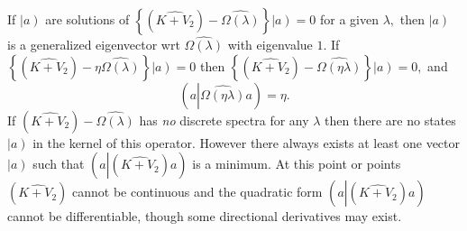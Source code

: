 \documentclass[aps,preprint]{revtex4}%
\begin{document}
If $\left\vert \overset{}{a}\right)  $ are solutions of $\left\{  \left(
\widehat{K+V_{2}}\right)  -\widehat{\Omega\left(  \lambda\right)  }\right\}
\left\vert \overset{}{a}\right)  =0$ for a given $\lambda,$ then $\left\vert
\overset{}{a}\right)  $ is a generalized eigenvector wrt $\widehat{\Omega
\left(  \lambda\right)  }$ with eigenvalue $1.$ If $\left\{  \left(
\widehat{K+V_{2}}\right)  -\eta\widehat{\Omega\left(  \lambda\right)
}\right\}  \left\vert \overset{}{a}\right)  =0$ then $\left\{  \left(
\widehat{K+V_{2}}\right)  -\widehat{\Omega\left(  \eta\lambda\right)
}\right\}  \left\vert \overset{}{a}\right)  =0,$ and
\begin{equation}
\left(  a\left\vert \widehat{\Omega\left(  \eta\lambda\right)  }\right.
a\right)  =\eta.
\end{equation}
If $\left(  \widehat{K+V_{2}}\right)  -\widehat{\Omega\left(  \lambda\right)
}$ has \emph{no} discrete spectra for any $\lambda$ then there are no states
$\left\vert \overset{}{a}\right)  $ in the kernel of this operator. However
there always exists at least one vector $\left\vert \overset{}{a}\right)  $
such that $\left(  a\left\vert \left(  \widehat{K+V_{2}}\right)  \right.
a\right)  $ is a minimum. At this point or points $\left(  \widehat{K+V_{2}%
}\right)  $ cannot be continuous and the quadratic form $\left(  a\left\vert
\left(  \widehat{K+V_{2}}\right)  \right.  a\right)  $ cannot be
differentiable, though some directional derivatives may exist.
\end{document}
